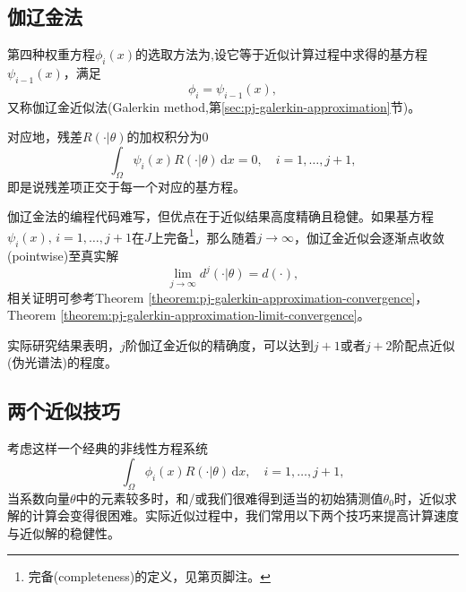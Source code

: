 \subsection{伽辽金法}
\label{sec:pj-weight-galerkin}
第四种权重方程$\phi_{i}(x)$的选取方法为,设它等于近似计算过程中求得的基方程$\psi_{i-1}(x)$，满足
\begin{equation*}
  \phi_{i} = \psi_{i-1}(x),
\end{equation*}
又称伽辽金近似法(Galerkin method,第\ref{sec:pj-galerkin-approximation}节)。

对应地，残差$R \left( \cdot | \theta \right)$的加权积分为$0$
\begin{equation*}
  \int_{\Omega} \psi_{i}(x) R \left( \cdot | \theta \right) \, \mathrm{d} x =0, \quad i = 1, \ldots, j+1,
\end{equation*}
即是说残差项正交于每一个对应的基方程。

伽辽金法的编程代码难写，但优点在于近似结果高度精确且稳健。如果基方程$\psi_{i}(x), \, i = 1, \ldots, j+1$在$J$上完备\footnote{完备(completeness)的定义，见第\pageref{def:completeness-space}页脚注。}，那么随着$j \rightarrow \infty$，伽辽金近似会逐渐点收敛(pointwise)至真实解
\begin{equation*}
  \lim_{j \rightarrow \infty} d^{j} \left( \cdot | \theta \right) = d \left( \cdot \right),
\end{equation*}
相关证明可参考Theorem \ref{theorem:pj-galerkin-approximation-convergence}，
Theorem \ref{theorem:pj-galerkin-approximation-limit-convergence}。

实际研究结果表明，$j$阶伽辽金近似的精确度，可以达到$j+1$或者$j+2$阶配点近似(伪光谱法)的程度。

\subsection{两个近似技巧}
\label{sec:pj-approximation-tips}
考虑这样一个经典的非线性方程系统
\begin{equation}
  \label{eq:pj-nonlin-sys}
  \int_{\Omega} \phi_{i}(x) R\left( \cdot | \theta \right) \, \mathrm{d} x, \quad i = 1,\ldots,j+1,
\end{equation}
当系数向量$\theta$中的元素较多时，和/或我们很难得到适当的初始猜测值$\theta_{0}$时，近似求解的计算会变得很困难。实际近似过程中，我们常用以下两个技巧来提高计算速度与近似解的稳健性。

